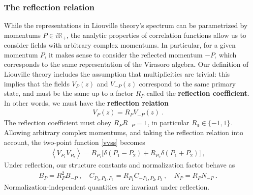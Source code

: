 \documentclass[12pt, a4paper, notitlepage, twoside]{report}
\numberwithin{equation}{section}
\theoremstyle{break}
\begin{document}
\subsubsection{The reflection relation}

While the representations in Liouville theory's spectrum can be parametrized by momentums $P\in i\mathbb{R}_+$, the analytic properties of correlation functions allow us to consider fields with arbitrary complex momentums. 
In particular, for a given momentum $P$, it makes sense to consider the reflected momentum $-P$, which corresponds to the same representation of the Virasoro algebra. 
Our definition of Liouville theory includes the assumption that multiplicities are trivial: this implies that the fields $V_P(z)$ and $V_{-P}(z)$ correspond to the same primary state, and must be the same up to a factor $R_P$ called the \textbf{\boldmath reflection coefficient}. In other words, we must have the \textbf{\boldmath reflection relation}
\begin{align}
V_P(z)= R_P V_{-P}(z)\ .
\label{vrv}
\end{align}
The reflection coefficient must obey $R_PR_{-P}=1$, in particular $R_0\in \{-1,1\}$. Allowing arbitrary complex momentums, and taking the reflection relation into account, the two-point function \eqref{vvss} becomes 
\begin{align}
 \left<V_{P_1}V_{P_2}\right> = B_{P_1}\Big[ \delta(P_1-P_2) + R_{P_2}\delta(P_1+P_2) \Big]\ ,
\end{align}
Under reflection, our structure constants and normalization factor behave as 
\begin{align}
 B_P=R_P^2B_{-P} \ , \quad C_{P_1,P_2,P_3} = R_{P_1} C_{-P_1,P_2,P_3} \ , \quad N_P=R_PN_{-P}\ .
\end{align}
Normalization-independent quantities are invariant under reflection.
\end{document}
